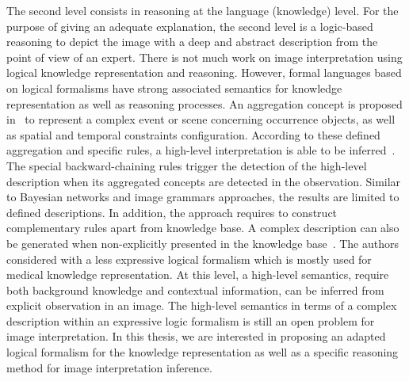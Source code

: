 \documentclass{article}
\begin{document}
The second level consists in reasoning at the language (knowledge) level.
For the purpose of giving an adequate explanation, the second level is a logic-based reasoning to depict the image with a deep and abstract description from the point of view of an expert.
There is not much work on image interpretation using logical knowledge representation and reasoning. 
However, formal languages based on logical formalisms have  strong associated semantics for knowledge representation as well as reasoning processes. 
An aggregation concept is proposed in~\cite{Espinosa07multimedia} to represent a complex event or scene concerning occurrence objects, as well as spatial and temporal constraints configuration.
According to these defined aggregation and specific rules, a high-level interpretation is able to be inferred~\cite{neumann2008scene}.
The special backward-chaining rules trigger the detection of the high-level description when its aggregated concepts are detected in the observation.
Similar to Bayesian networks and image grammars approaches,  the results are limited to defined descriptions.
In addition, the approach requires to construct complementary rules apart from knowledge base.
A complex description can also be generated when non-explicitly presented in the knowledge base~\cite{atif2014explanatory}.
The authors considered with a less expressive logical formalism which is mostly used for medical knowledge representation.
At this level, a high-level semantics, require both background knowledge and contextual information, can be inferred from explicit observation in an image.
The high-level semantics in terms of a complex description within an expressive logic formalism is still an open problem for image interpretation.
In this thesis, we are interested in proposing an adapted logical formalism for the knowledge representation as well as a specific reasoning method for image interpretation inference.



% 
% 
\end{document}
